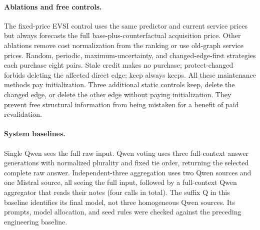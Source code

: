 \paragraph{Ablations and free controls.}
The fixed-price EVSI control uses the same predictor and current service
prices but always forecasts the full base-plus-counterfactual acquisition
price. Other ablations remove cost normalization from the ranking or use
old-graph service prices. Random, periodic, maximum-uncertainty, and
changed-edge-first strategies each purchase eight pairs. Stale credit makes
no purchase; protect-changed forbids deleting the affected direct edge;
keep always keeps. All these maintenance methods pay initialization.
Three additional static controls keep, delete the changed edge, or delete
the other edge without paying initialization. They prevent free structural
information from being mistaken for a benefit of paid revalidation.

\paragraph{System baselines.}
Single Qwen sees the full raw input. Qwen voting uses three full-context
answer generations with normalized plurality and fixed tie order, returning
the selected complete raw answer. Independent-three aggregation uses two
Qwen sources and one Mistral source, all seeing the full input, followed by
a full-context Qwen aggregator that reads their notes (four calls in total).
The suffix Q in this baseline identifies its final model, not three
homogeneous Qwen sources. Its prompts, model allocation, and seed rules were
checked against the preceding engineering baseline.
